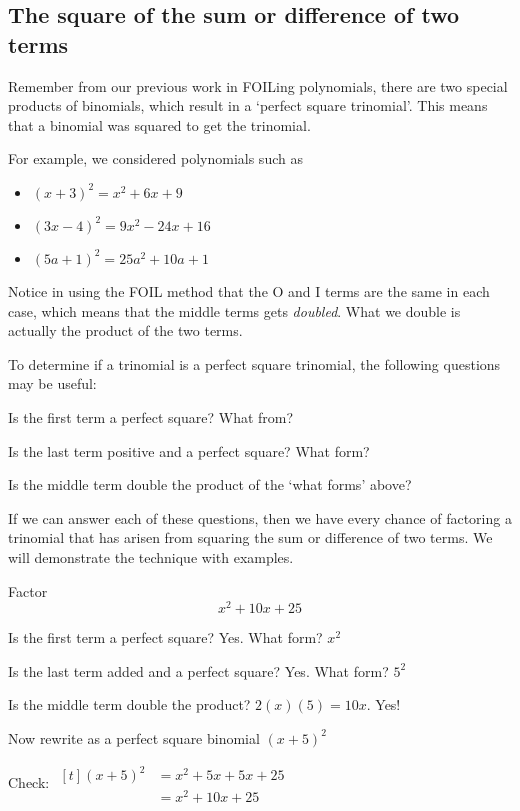 \subsection{The square of the sum or difference of two terms}
Remember from our previous work in FOILing polynomials, there are two special products
of binomials, which result in a `perfect square \gls{trinomial}'. This means that a binomial was
squared to get the trinomial. 

For example, we considered polynomials such as 
\begin{itemize}
	\item $(x+3)^2 = x^2+6x+9$
	\item $(3x-4)^2 = 9x^2-24x+16$
	\item $(5a+1)^2 = 25a^2+10a+1$
\end{itemize} 
Notice in using the FOIL method that the {\color{blue}O} and {\color{blue}I} 
terms are the same in each case, which means that the middle terms gets {\em doubled}. 
What we double is actually the product of the two terms. 

To determine if a trinomial is a perfect square trinomial, the following questions may be useful:
\begin{steps}
	\item Is the first term a perfect square? What from?	
	\item Is the last term positive and a perfect square? What form?
	\item Is the middle term double the product of the `what forms' above?
\end{steps} 
If we can answer each of these questions, then we have every chance of factoring a trinomial
that has arisen from squaring the sum or difference of two terms. We will demonstrate the technique
with examples.

\begin{myexample}
Factor
\[
	x^2+10x+25
\]
{}
\end{myexample}
\begin{myProof}
	\begin{steps}
		\item Is the first term a perfect square?          \hfill Yes.  What form? $x^2$
		\item Is the last term added and a perfect square? \hfill Yes.  What form? $5^2$ 
		\item Is the middle term double the product? \hfill $2(x)(5)=10x$. Yes! 
		\item Now rewrite as a perfect square binomial     \hfill $(x+5)^2$ 
		\item Check:
		$\begin{aligned}[t]
			(x+5)^2 & =		x^2+5x+5x+25 \\
			        & =		x^2+10x+25   
		\end{aligned}$
	\end{steps}
	{}
\end{myProof} 

